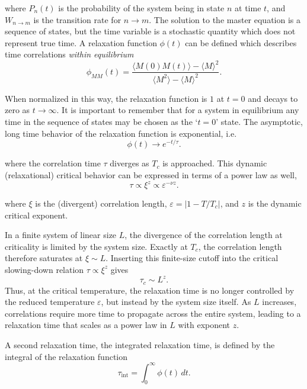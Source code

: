 \documentclass{article}
\begin{document}
where $P_n(t)$ is the probability of the system being in state $n$ at time $t$,
and $W_{n \to m}$ is the transition rate for $n \to m$.
The solution to the master equation is a sequence of states, but the time variable
is a stochastic quantity which does not represent true time.
A relaxation function $\phi(t)$ can be defined which describes time correlations
\emph{within equilibrium}
\begin{equation}
\phi_{MM}(t)
= \frac{\langle M(0)M(t)\rangle - \langle M \rangle^2}
{\langle M^2 \rangle - \langle M \rangle^2}.
\end{equation}

When normalized in this way, the relaxation function is $1$ at $t = 0$ and
decays to zero as $t \to \infty$. It is important to remember that for a system
in equilibrium any time in the sequence of states may be chosen as the
`$t=0$' state. The asymptotic, long time behavior of the relaxation function
is exponential, i.e.
\begin{equation}
\phi(t) \to e^{-t/\tau}.
\end{equation}

where the correlation time $\tau$ diverges as $T_c$ is approached. This
dynamic (relaxational) critical behavior can be expressed in terms of
a power law as well,
\begin{equation}
\tau \propto \xi^{z} \propto \varepsilon^{-\nu z}.
\end{equation}

where $\xi$ is the (divergent) correlation length,
$\varepsilon = |1 - T/T_c|$, and $z$ is the dynamic critical exponent.

In a finite system of linear size $L$, the divergence of the correlation
length at criticality is limited by the system size. Exactly at $T_c$,
the correlation length therefore saturates at $\xi \sim L$. Inserting
this finite-size cutoff into the critical slowing-down relation
$\tau \propto \xi^{z}$ gives
\begin{equation}
\tau_c \sim L^{z}.
\end{equation}
Thus, at the critical temperature, the relaxation time is no longer
controlled by the reduced temperature $\varepsilon$, but instead by the
system size itself. As $L$ increases, correlations require more time to
propagate across the entire system, leading to a relaxation time that
scales as a power law in $L$ with exponent $z$.


A second relaxation time, the integrated relaxation time, is defined by the
integral of the relaxation function
\begin{equation}
\tau_{\mathrm{int}} = \int_{0}^{\infty} \phi(t)\, dt.
\end{equation}
\end{document}

